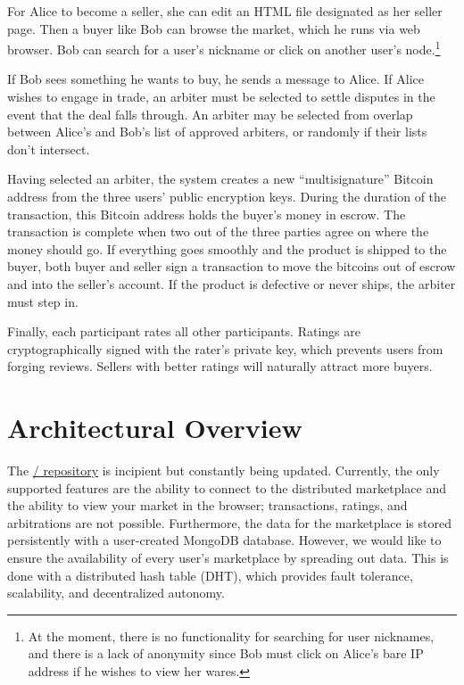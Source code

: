 \documentclass[12pt,twocolumn]{article}
\begin{document}
For Alice to become a seller, she can edit an HTML file designated as her seller page.
Then a buyer like Bob can browse the market, which he runs via web browser.
Bob can search for a user's nickname or click on another user's node.\footnote{At the moment, there is no functionality for searching for user nicknames, and there is a lack of anonymity since Bob must click on Alice's bare IP address if he wishes to view her wares.}

If Bob sees something he wants to buy, he sends a message to Alice.
If Alice wishes to engage in trade, an arbiter must be selected to settle disputes in the event that the deal falls through.
An arbiter may be selected from overlap between Alice's and Bob's list of approved arbiters, or randomly if their lists don't intersect.

Having selected an arbiter, the system creates a new ``multisignature'' Bitcoin address from the three users' public encryption keys.
During the duration of the transaction, this Bitcoin address holds the buyer's money in escrow.
The transaction is complete when two out of the three parties agree on where the money should go.
If everything goes smoothly and the product is shipped to the buyer, both buyer and seller sign a transaction to move the bitcoins out of escrow and into the seller's account.
If the product is defective or never ships, the arbiter must step in.

Finally, each participant rates all other participants.
Ratings are cryptographically signed with the rater's private key, which prevents users from forging reviews.
Sellers with better ratings will naturally attract more buyers. 

\section{Architectural Overview}
The \href{https://github.com/OpenBazaar/OpenBazaar}{{\OpenBazaar/} repository} is incipient but constantly being updated.
Currently, the only supported features are the ability to connect to the distributed marketplace and the ability to view your market in the browser; transactions, ratings, and arbitrations are not possible.
Furthermore, the data for the marketplace is stored persistently with a user-created MongoDB database.
However, we would like to ensure the availability of every user's marketplace by spreading out data.
This is done with a distributed hash table (DHT), which provides fault tolerance, scalability, and decentralized autonomy.
\end{document}
